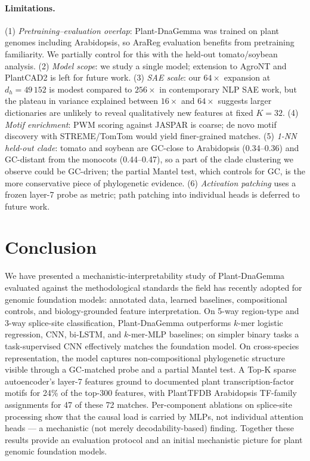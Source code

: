 \documentclass{article}
\begin{document}
\paragraph{Limitations.}
\label{sec:limitations}
(1) \emph{Pretraining--evaluation overlap}: Plant-DnaGemma was trained on
plant genomes including Arabidopsis, so AraReg evaluation benefits from
pretraining familiarity. We partially control for this with the held-out
tomato/soybean analysis. (2) \emph{Model scope}: we study a single model;
extension to AgroNT and PlantCAD2 is left for future work. (3) \emph{SAE
scale}: our $64\times$ expansion at $d_h=49\,152$ is modest compared to
$256\times$ in contemporary NLP SAE work, but the plateau in variance
explained between $16\times$ and $64\times$ suggests larger dictionaries
are unlikely to reveal qualitatively new features at fixed $K=32$. (4)
\emph{Motif enrichment}: PWM scoring against JASPAR is coarse; de novo
motif discovery with STREME/TomTom would yield finer-grained matches.
(5) \emph{1-NN held-out clade}: tomato and soybean are GC-close to
Arabidopsis (0.34--0.36) and GC-distant from the monocots (0.44--0.47),
so a part of the clade clustering we observe could be GC-driven; the
partial Mantel test, which controls for GC, is the more conservative
piece of phylogenetic evidence. (6) \emph{Activation patching} uses a
frozen layer-7 probe as metric; path patching into individual heads
\citep{wang2023interpretability} is deferred to future work.

\section{Conclusion}

We have presented a mechanistic-interpretability study of Plant-DnaGemma
evaluated against the methodological standards the field has recently
adopted for genomic foundation models: annotated data, learned baselines,
compositional controls, and biology-grounded feature interpretation. On
5-way region-type and 3-way splice-site classification, Plant-DnaGemma
outperforms $k$-mer logistic regression, CNN, bi-LSTM, and $k$-mer-MLP
baselines; on simpler binary tasks a task-supervised CNN effectively
matches the foundation model. On cross-species representation, the model
captures non-compositional phylogenetic structure visible through a
GC-matched probe and a partial Mantel test. A Top-K sparse autoencoder's
layer-7 features ground to documented plant transcription-factor motifs
for 24\% of the top-300 features, with PlantTFDB Arabidopsis TF-family
assignments for 47 of these 72 matches. Per-component ablations on splice-site processing
show that the causal load is carried by MLPs, not individual attention
heads --- a mechanistic (not merely decodability-based) finding. Together
these results provide an evaluation protocol and an initial mechanistic
picture for plant genomic foundation models.
\end{document}
